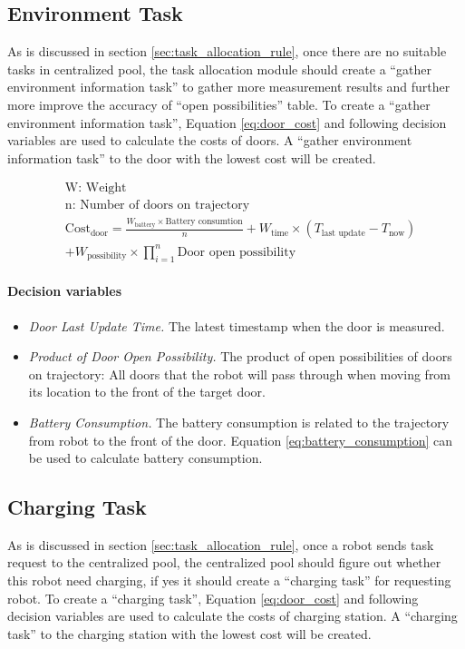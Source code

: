\subsection{Environment Task}
As is discussed in section \ref{sec:task_allocation_rule}, once there are no suitable tasks in centralized pool, the task allocation module should create a ``gather environment information task'' to gather more measurement results and further more improve the accuracy of ``open possibilities'' table.
To create a ``gather environment information task'', Equation \ref{eq:door_cost} and following decision variables are used to calculate the costs of doors. A ``gather environment information task'' to the door with the lowest cost will be created.

\begin{equation}
	\label{eq:door_cost}
	\begin{aligned}
	& \mbox{W: Weight } \\
	& \mbox{n: Number of doors on trajectory} \\	
	& \mbox{Cost}_{\mbox{door}} = \frac{W_{\mbox{battery}} \times \mbox{Battery consumtion}}{n} + W_{\mbox{time}} \times (T_{\mbox{last update}} - T_{\mbox{now}}) \\
	& + W_{\mbox{possibility}} \times \prod\limits_{i=1}^n \mbox{Door open possibility}
	\end{aligned}
\end{equation}

\paragraph{Decision variables}
\begin{itemize}
	\item \textsl{Door Last Update Time.} The latest timestamp when the door is measured.
	\item \textsl{Product of Door Open Possibility.} The product of open possibilities of doors on trajectory: All doors that the robot will pass through when moving from its location to the front of the target door.
	\item \textsl{Battery Consumption.} The battery consumption is related to the trajectory from robot to the front of the door. Equation \ref{eq:battery_consumption} can be used to calculate battery consumption.
\end{itemize}



\subsection{Charging Task}
As is discussed in section \ref{sec:task_allocation_rule}, once a robot sends task request to the centralized pool, the centralized pool should figure out whether this robot need charging, if yes it should create a ``charging task'' for requesting robot. 
To create a ``charging task'', Equation \ref{eq:door_cost} and following decision variables are used to calculate the costs of charging station. A ``charging task'' to the charging station with the lowest cost will be created.

